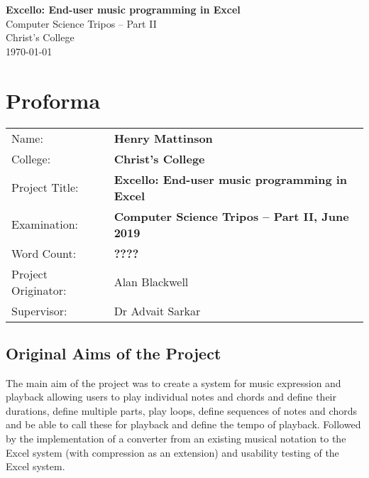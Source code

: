 \documentclass[12pt,a4paper,twoside,openright]{report}
\begin{document}





\pagestyle{empty}


\vspace*{60mm}
\begin{center}
\Huge
\textbf{Excello: End-user music programming in Excel} \\[5mm]
Computer Science Tripos -- Part II \\[5mm]
Christ's College \\[5mm]
\today  %
\end{center}


\pagestyle{plain}

\chapter*{Proforma}

{\large
\begin{tabular}{ll}
Name:               & \bf Henry Mattinson                      \\
College:            & \bf Christ's College                     \\
Project Title:      & \bf Excello: End-user music programming in Excel \\
Examination:        & \bf Computer Science Tripos -- Part II, June 2019  \\
Word Count:         & \bf ????\footnotemark[1]  \\
Project Originator: & Alan Blackwell                    \\
Supervisor:         & Dr Advait Sarkar                    \\
\end{tabular}
}


\section*{Original Aims of the Project}

The main aim of the project was to create a system for music expression and playback allowing users to play individual notes and chords and define their durations, define multiple parts, play loops, define sequences of notes and chords and be able to call these for playback and define the tempo of playback. Followed by the implementation of a converter from an existing musical notation to the Excel system (with compression as an extension) and usability testing of the Excel system.
\end{document}
